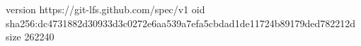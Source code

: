 version https://git-lfs.github.com/spec/v1
oid sha256:dc4731882d30933d3c0272e6aa539a7efa5cbdad1de11724b89179ded782212d
size 262240
